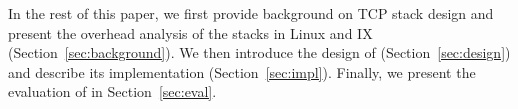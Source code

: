 In the rest of this paper, we first provide background on TCP stack
design and present the overhead analysis of the stacks in Linux and IX
(Section~\ref{sec:background}). We then introduce the design of
\softtcp (Section~\ref{sec:design}) and describe its implementation
(Section~\ref{sec:impl}). Finally, we present the evaluation of
\softtcp in Section~\ref{sec:eval}.
